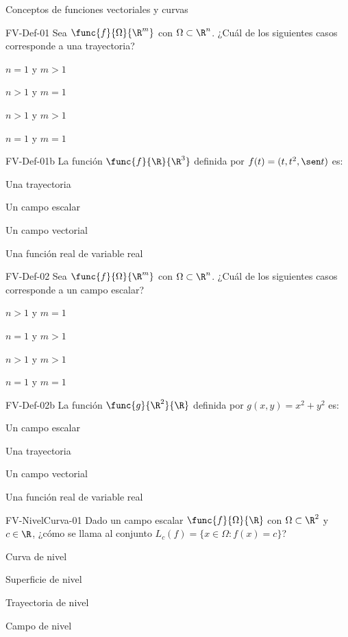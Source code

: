 \documentclass[a4,11pt]{aleph-notas}
\begin{document}
\begin{quiz}{Conceptos de funciones vectoriales y curvas}

\begin{multi}[]%
    {FV-Def-01}
    Sea $\func{f}{\Omega}{\R^m}$ con $\Omega\subset\R^n$. ¿Cuál de los siguientes casos corresponde a una {trayectoria}?
    \item* \(n=1\) y \(m>1\)
    \item \(n>1\) y $m=1$
    \item \(n>1\) y \(m>1\)
    \item $n=1$ y $m=1$
\end{multi}

\begin{multi}[]%
    {FV-Def-01b}
    La función $\func{f}{\R}{\R^3}$ definida por $f(t)=(t, t^2, \sen t)$ es:
    \item* Una trayectoria
    \item Un campo escalar
    \item Un campo vectorial
    \item Una función real de variable real
\end{multi}

\begin{multi}[]%
    {FV-Def-02}
    Sea $\func{f}{\Omega}{\R^m}$ con $\Omega\subset\R^n$. ¿Cuál de los siguientes casos corresponde a un {campo escalar}?
    \item* \(n>1\) y $m=1$
    \item $n=1$ y \(m>1\)
    \item \(n>1\) y \(m>1\)
    \item $n=1$ y $m=1$
\end{multi}

\begin{multi}[]%
    {FV-Def-02b}
    La función $\func{g}{\R^2}{\R}$ definida por $g(x,y)=x^2+y^2$ es:
    \item* Un campo escalar
    \item Una trayectoria
    \item Un campo vectorial
    \item Una función real de variable real
\end{multi}

\begin{multi}[]%
    {FV-NivelCurva-01}
    Dado un campo escalar $\func{f}{\Omega}{\R}$ con $\Omega\subset\R^2$ y $c\in\R$, ¿cómo se llama al conjunto $L_c(f)=\{x\in\Omega : f(x)=c\}$?
    \item* Curva de nivel
    \item Superficie de nivel
    \item Trayectoria de nivel
    \item Campo de nivel
\end{multi}


\end{quiz}
\end{document}

